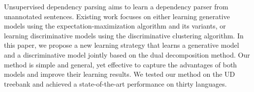 Unsupervised dependency parsing aims to learn a dependency parser from unannotated sentences. Existing work focuses on either learning generative models using the expectation-maximization algorithm and its variants, or learning discriminative models using the discriminative clustering algorithm. In this paper, we propose a new learning strategy that learns a generative model and a discriminative model jointly based on the dual decomposition method. Our method is simple and general, yet effective to capture the advantages of both models and improve their learning results. We tested our method on the UD treebank and achieved a state-of-the-art performance on thirty languages.
